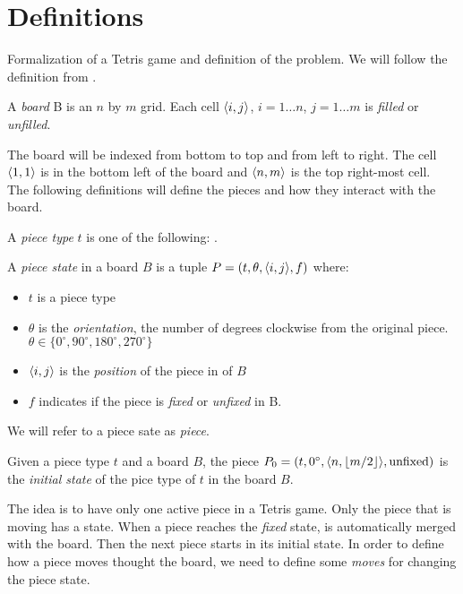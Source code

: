 \section{Definitions}

Formalization of a Tetris game and definition of the problem. We will follow the definition from \cite{TIH}.


\begin{definition}
  A \emph{board} B is an $n$ by $m$ grid. Each cell $\cell$, $i = 1\dots n$, $j = 1\dots m$ is \emph{filled} or \emph{unfilled}.
\end{definition}

The board will be indexed from bottom to top and from left to right. The cell $\cell[1][1]$ is in the bottom left of the board and $\cell[n][m]$ is the top right-most cell. \\

The following definitions will define the pieces and how they interact with the board.

\begin{definition}
  A \emph{piece type} $t$ is one of the following:  \ALL. 
\end{definition}

\begin{definition}
 A \emph{piece state} in a board $B$ is a tuple $ P = \piece$ where:
  \begin{itemize}
    \item $t$ is a piece type
    \item $\theta$ is the \emph{orientation}, the number of degrees clockwise from the original piece. $ \theta \in \lbrace 0^\circ, 90^\circ, 180^\circ, 270^\circ \rbrace$
    \item $\cell$ is the \emph{position} of the piece in of $B$
    \item  $f$ indicates if the piece is \emph{fixed} or \emph{unfixed} in B.
  \end{itemize}

  We will refer to a piece sate as \emph{piece}.
   
\end{definition}

\begin{definition}
  Given a piece type $t$ and a board $B$, the piece $P_0 = \piece[t][0^\circ][n][\lfloor m / 2 \rfloor][\text{unfixed}]$ is the \emph{initial state} of the pice type of $t$ in the board $B$.
\end{definition}


The idea is to have only one active piece in a Tetris game. Only the piece that is moving has a state. When a piece reaches the \emph{fixed} state, is automatically merged with the board. Then the next piece starts in its initial state. In order to define how a piece moves thought the board, we need to define some \emph{moves} for changing the piece state.

